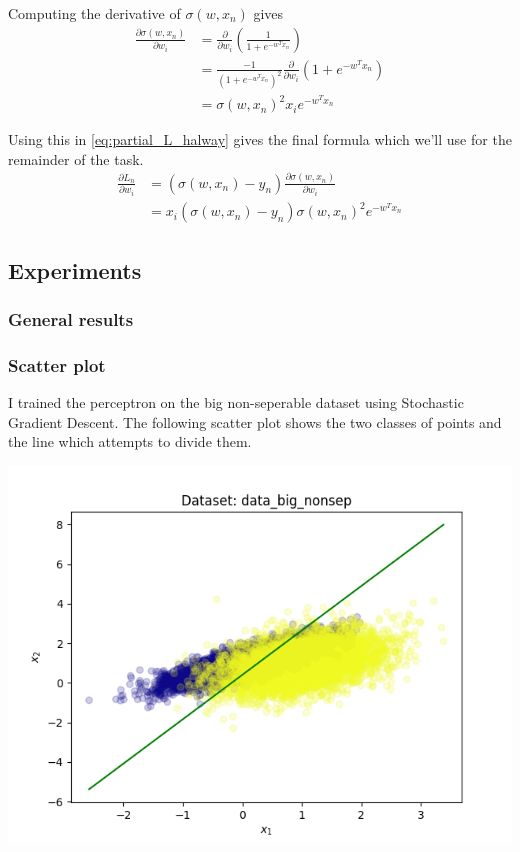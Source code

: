 \documentclass{article}
\begin{document}
Computing the derivative of $\sigma(w,x_n)$ gives
\begin{align}
	\frac{\partial \sigma(w,x_n)}{\partial w_i} &= \frac{\partial}{\partial w_i}\left( \frac{1}{1+e^{-w^Tx_n}} \right) \\
	&= \frac{-1}{(1+e^{-w^T x_n})^2} \frac{\partial}{\partial w_i}(1 + e^{-w^Tx_n}) \\
	&= \sigma(w,x_n)^2 x_i e^{-w^T x_n}
\end{align}

Using this in \cref{eq:partial_L_halway} gives the final formula which we'll use for the remainder of the task. 
\begin{align}
	\frac{\partial L_n}{\partial w_i} &= (\sigma(w,x_n) - y_n) \frac{\partial \sigma(w,x_n)}{\partial w_i}  \\
	&= x_i (\sigma(w,x_n) - y_n) \sigma(w,x_n)^2 e^{-w^T x_n}
\end{align} 

\subsection{Experiments}
\subsubsection{General results}


\subsubsection{Scatter plot}
I trained the perceptron on the big non-seperable dataset using Stochastic Gradient Descent. The following scatter plot shows the two classes of points and the line which attempts to divide them. 

\begin{centering}
\includegraphics[width=0.9\linewidth]{ex4_scatter_training.png}
\end{centering}
\end{document}
